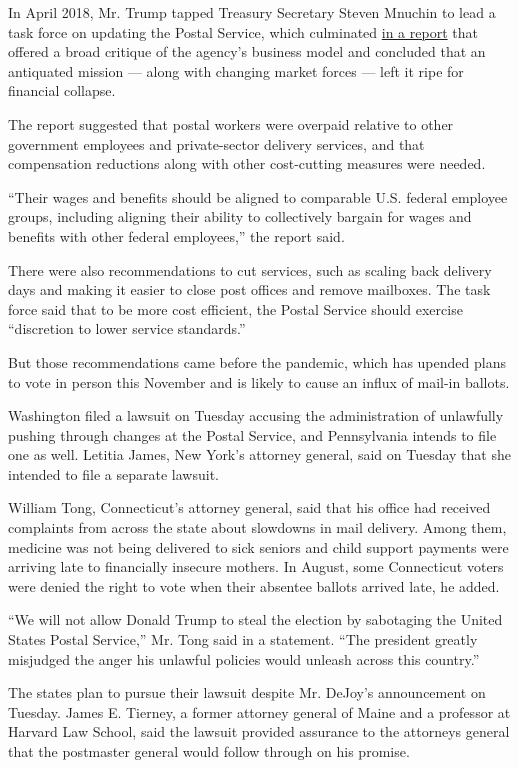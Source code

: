 In April 2018, Mr. Trump tapped Treasury Secretary Steven Mnuchin to
lead a task force on updating the Postal Service, which culminated
\href{https://home.treasury.gov/system/files/136/USPS_A_Sustainable_Path_Forward_report_12-04-2018.pdf}{in
a report} that offered a broad critique of the agency's business model
and concluded that an antiquated mission --- along with changing market
forces --- left it ripe for financial collapse.

The report suggested that postal workers were overpaid relative to other
government employees and private-sector delivery services, and that
compensation reductions along with other cost-cutting measures were
needed.

``Their wages and benefits should be aligned to comparable U.S. federal
employee groups, including aligning their ability to collectively
bargain for wages and benefits with other federal employees,'' the
report said.

There were also recommendations to cut services, such as scaling back
delivery days and making it easier to close post offices and remove
mailboxes. The task force said that to be more cost efficient, the
Postal Service should exercise ``discretion to lower service
standards.''

But those recommendations came before the pandemic, which has upended
plans to vote in person this November and is likely to cause an influx
of mail-in ballots.

Washington filed a lawsuit on Tuesday accusing the administration of
unlawfully pushing through changes at the Postal Service, and
Pennsylvania intends to file one as well. Letitia James, New York's
attorney general, said on Tuesday that she intended to file a separate
lawsuit.

William Tong, Connecticut's attorney general, said that his office had
received complaints from across the state about slowdowns in mail
delivery. Among them, medicine was not being delivered to sick seniors
and child support payments were arriving late to financially insecure
mothers. In August, some Connecticut voters were denied the right to
vote when their absentee ballots arrived late, he added.

``We will not allow Donald Trump to steal the election by sabotaging the
United States Postal Service,'' Mr. Tong said in a statement. ``The
president greatly misjudged the anger his unlawful policies would
unleash across this country.''

The states plan to pursue their lawsuit despite Mr. DeJoy's announcement
on Tuesday. James E. Tierney, a former attorney general of Maine and a
professor at Harvard Law School, said the lawsuit provided assurance to
the attorneys general that the postmaster general would follow through
on his promise.

